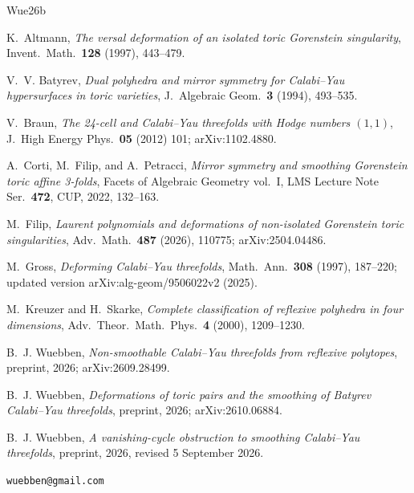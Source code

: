 \documentclass[11pt]{amsart}
\theoremstyle{definition}
\theoremstyle{remark}
\begin{document}
\begin{thebibliography}{Wue26b}

K.~Altmann,
\emph{The versal deformation of an isolated toric Gorenstein singularity},
Invent.\ Math.\ \textbf{128} (1997), 443--479.

V.~V. Batyrev,
\emph{Dual polyhedra and mirror symmetry for Calabi--Yau hypersurfaces in
toric varieties},
J.\ Algebraic Geom.\ \textbf{3} (1994), 493--535.

V.~Braun,
\emph{The 24-cell and Calabi--Yau threefolds with Hodge numbers $(1,1)$},
J.\ High Energy Phys.\ \textbf{05} (2012) 101; arXiv:1102.4880.

A.~Corti, M.~Filip, and A.~Petracci,
\emph{Mirror symmetry and smoothing Gorenstein toric affine 3-folds},
Facets of Algebraic Geometry vol.~I, LMS Lecture Note Ser.\ \textbf{472},
CUP, 2022, 132--163.

M.~Filip,
\emph{Laurent polynomials and deformations of non-isolated Gorenstein toric
singularities},
Adv.\ Math.\ \textbf{487} (2026), 110775; arXiv:2504.04486.

M.~Gross,
\emph{Deforming Calabi--Yau threefolds},
Math.\ Ann.\ \textbf{308} (1997), 187--220; updated version
arXiv:alg-geom/9506022v2 (2025).

M.~Kreuzer and H.~Skarke,
\emph{Complete classification of reflexive polyhedra in four dimensions},
Adv.\ Theor.\ Math.\ Phys.\ \textbf{4} (2000), 1209--1230.

B.~J. Wuebben,
\emph{Non-smoothable Calabi--Yau threefolds from reflexive polytopes},
preprint, 2026; arXiv:2609.28499.

B.~J. Wuebben,
\emph{Deformations of toric pairs and the smoothing of
Batyrev Calabi--Yau threefolds},
preprint, 2026; arXiv:2610.06884.

 B.~J. Wuebben, \emph{A vanishing-cycle obstruction to smoothing Calabi--Yau threefolds},
preprint, 2026, revised 5 September 2026.
\end{thebibliography}

\bigskip
{} \texttt{wuebben@gmail.com}
\end{document}

